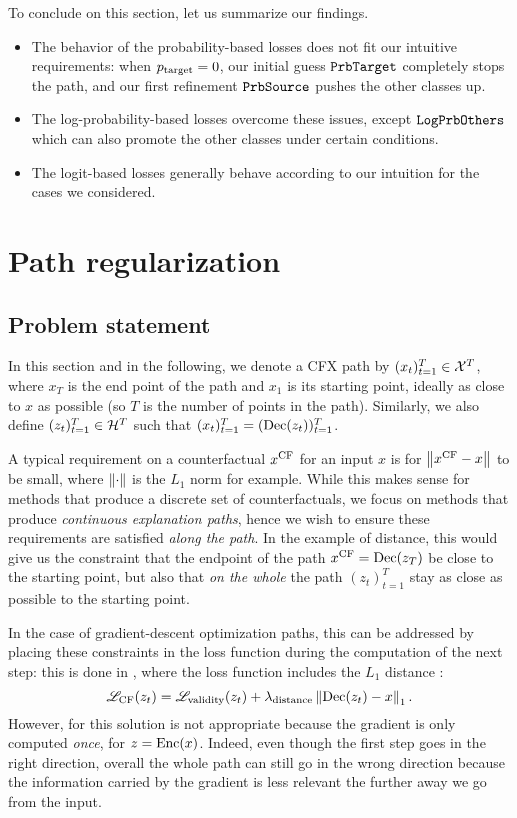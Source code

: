 \documentclass[../main.tex]{subfiles}
\begin{document}
To conclude on this section, let us summarize our findings.
\begin{itemize}
    \item The behavior of the probability-based losses does not fit our intuitive requirements:
    when $p_{\mathrm{target}} = 0$, our initial guess $\mathtt{PrbTarget}$ completely stops the path, and our first
    refinement $\mathtt{PrbSource}_{}$ pushes the other classes up.
    \item The log-probability-based losses overcome these issues, except $\mathtt{LogPrbOthers}_{}$ which can also
    promote the other classes under certain conditions.
    \item The logit-based losses generally behave according to our intuition for the cases we considered.
\end{itemize}

\section{Path regularization}

\subsection{Problem statement}

In this section and in the following, we denote a CFX path by $(x_t)_{t=1}^T \in \mathcal{X}^T$, where $x_T$ is the end point of the path and
$x_1$ is its starting point, ideally as close to $x$ as possible (so $T$ is the number of points in the path).
Similarly, we also define $(z_t)_{t=1}^T \in \mathcal{H}^T$ such that $(x_t)_{t=1}^T = (\operatorname{Dec}(z_t))_{t=1}^T$.

A typical requirement on a counterfactual $x^\mathrm{CF}$ for an input $x$ is for $\left\lVert x^\mathrm{CF} - x\right\rVert$ to be small, where $\left\lVert\cdot\right\rVert$ is the $L_1$ norm for example.
While this makes sense for methods that produce a discrete set of counterfactuals, we focus on methods that produce \emph{continuous explanation paths}, hence we wish to ensure these requirements are satisfied \emph{along the path}.
In the example of distance, this would give us the constraint that the endpoint of the path $x^\mathrm{CF} = \operatorname{Dec}(z_T)$ be close to the starting point, but also that \emph{on the whole} the path $(z_t)_{t=1}^T$ stay as close as possible to the starting point.

In the case of gradient-descent optimization paths, this can be addressed by placing these constraints in the loss function during the computation of the next step: this is done in \revise{}, where the loss function includes the $L_1$ distance \cite{joshiRealistic2019}:
\begin{equation*}
\mathscr{L}_\text{CF}(z_t) = \mathscr{L}_\text{validity}(z_t) + \lambda_\text{distance} \left\lVert\operatorname{Dec}(z_t) - x\right\rVert_1.
\end{equation*}
However, for \ls{} this solution is not appropriate because the gradient is only computed \emph{once}, for $z = \operatorname{Enc}(x)$.
Indeed, even though the first step goes in the right direction, overall the whole path can still go in the wrong direction because the information carried by the gradient is less relevant the further away we go from the input.
\end{document}
